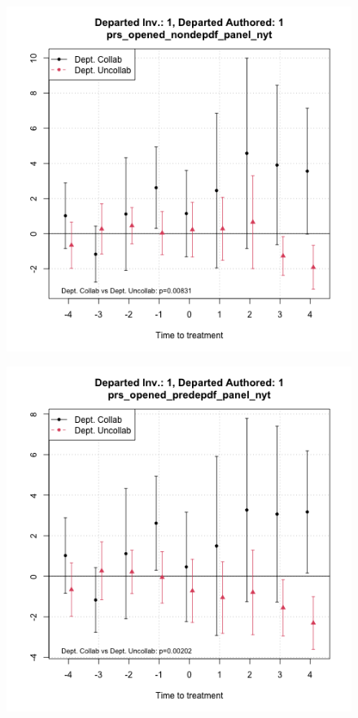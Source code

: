 \begin{figure}[htbp]
    \centering
    \begin{minipage}[b]{0.49\textwidth}
        \centering
        \includegraphics[width=\textwidth]{temp/output/collab_imp/auth1_inv1_cs_norm_prs_opened_nondep.png}
    \label{fig:prs_opened_nondep}
    \end{minipage}
    \hfill
    \begin{minipage}[b]{0.49\textwidth}
        \centering
        \includegraphics[width=\textwidth]{temp/output/collab_imp/auth1_inv1_cs_norm_prs_opened_predep.png}

\end{minipage}
\end{figure}
